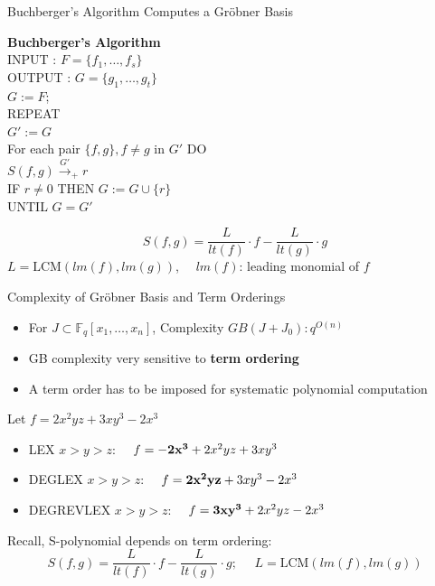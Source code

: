 \documentclass[xcolor=dvipsnames]{beamer}
\begin{document}
\begin{frame}{\large{Buchberger's Algorithm Computes a Gr\"obner Basis}}

{\bf Buchberger's Algorithm}\\
 INPUT : $F = \{f_1, \dots, f_s\}$\\
 OUTPUT : $G = \{g_1,\dots ,g_t\}$\\ %
  $G:= F$; \\
  REPEAT\\
  \hspace{0.1in} $G' := G$\\
  \hspace{0.1in} For each pair $\{f, g\}, f \neq g$ in $G'$ DO\\
\hspace{0.2in}  $S(f, g) \stackrel{G'}{\textstyle\longrightarrow}_+
r$ \\
\hspace{0.2in}  IF $r \neq 0$ THEN $G:= G \cup \{r\}$ \\
UNTIL $G = G'$

\[
S(f,g)=\frac{L}{lt(f)}\cdot f - \frac{L}{lt(g)}\cdot g
\]
$L = \text{LCM}(lm(f), lm(g))$, ~~$lm(f)$: leading monomial of $f$

\end{frame}


\begin{frame}{\large Complexity of Gr\"obner Basis and Term Orderings}
\begin{itemize}
\item For $J \subset \mathbb{F}_q[x_1, \dots, x_n]$, Complexity
  $GB(J + J_0): q^{O(n)}$
\item GB complexity very sensitive to {\bf term ordering}
\item A term order has to be imposed for systematic polynomial computation
\end{itemize}

Let $f = 2x^2yz + 3xy^3 - 2x^3$
\begin{itemize}
\item LEX $x> y> z$: ~~$f = {\bf -2x^3} + 2x^2yz + 3xy^3$
\item  DEGLEX $x>y>z$:  ~~$f = {\bf 2x^2yz} + 3xy^3 -2x^3$
\item DEGREVLEX $x>y>z$: ~~$f = {\bf 3xy^3} + 2x^2yz - 2x^3$
\end{itemize}
Recall, S-polynomial depends on term ordering:
\[
S(f,g)=\frac{L}{lt(f)}\cdot f - \frac{L}{lt(g)}\cdot g;
~~~~~~L = \text{LCM}(lm(f), lm(g))
\]

\end{frame}
\end{document}
